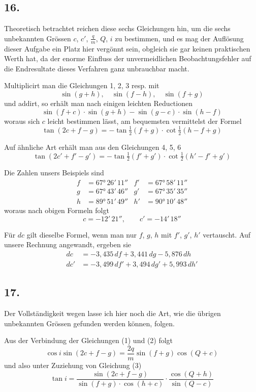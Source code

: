 \documentclass[12pt,a4paper]{article}
\begin{document}
\subsection*{16.}
Theoretisch betrachtet reichen diese sechs Gleichungen hin, um die sechs unbekannten Grössen $c$, $c'$, $\frac{q}{m}$, $Q$, $i$ zu bestimmen, und es mag der Auflösung dieser Aufgabe ein Platz hier vergönnt sein, obgleich sie gar keinen praktischen Werth hat, da der enorme Einfluss der unvermeidlichen Beobachtungsfehler auf die Endresultate dieses Verfahren ganz unbrauchbar macht.

Multiplicirt man die Gleichungen 1, 2, 3 resp. mit
\[ \sin(g + h), \quad \sin(f - h), \quad \sin(f + g) \]
und addirt, so erhält man nach einigen leichten Reductionen
\[ \sin(f + c) \cdot \sin(g + h) - \sin(g - c) \cdot \sin(h - f) \]
woraus sich $c$ leicht bestimmen lässt, am bequemsten vermittelst der Formel
\[ \tan(2c + f - g) = -\tan\tfrac{1}{2}(f + g) \cdot \cot\tfrac{1}{2}(h - f + g) \]

Auf ähnliche Art erhält man aus den Gleichungen 4, 5, 6
\[ \tan(2c' + f' - g') = -\tan\tfrac{1}{2}(f' + g') \cdot \cot\tfrac{1}{2}(h' - f' + g') \]

Die Zahlen unsers Beispiels sind
\begin{align*}
f &= 67°\,26'\,11'' & f' &= 67°\,58'\,11'' \\
g &= 67°\,43'\,46'' & g' &= 67°\,35'\,35'' \\
h &= 89°\,51'\,49'' & h' &= 90°\,10'\,48''
\end{align*}
woraus nach obigen Formeln folgt
\[ c = -12'\,21'', \qquad c' = -14'\,18'' \]

Für $dc$ gilt dieselbe Formel, wenn man nur $f$, $g$, $h$ mit $f'$, $g'$, $h'$ vertauscht. Auf unsere Rechnung angewandt, ergeben sie
\begin{align*}
dc &= -3{,}435\,df + 3{,}441\,dg - 5{,}876\,dh \\
dc' &= -3{,}499\,df' + 3{,}494\,dg' + 5{,}993\,dh'
\end{align*}

\subsection*{17.}
Der Vollständigkeit wegen lasse ich hier noch die Art, wie die übrigen unbekannten Grössen gefunden werden können, folgen.

Aus der Verbindung der Gleichungen (1) und (2) folgt
\[ \cos i \sin(2c + f - g) = \frac{2q}{m} \sin(f + g) \cos(Q + c) \]
und also unter Zuziehung von Gleichung (3)
\[ \tan i = \frac{\sin(2c + f - g)}{\sin(f + g) \cdot \cos(h + c)} \cdot \frac{\cos(Q + h)}{\sin(Q - c)} \]
\end{document}
